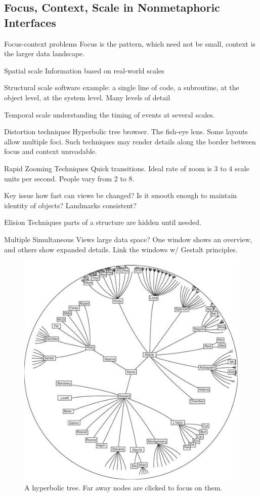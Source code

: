 \begin{mdframed}\begin{multicols}{2}
\subsection{Focus, Context, Scale in Nonmetaphoric Interfaces}
\begin{compactdesc}
\item[Focus-context problems]
    Focus is the pattern, which need not be small, context is the larger data
    landscape.
    \begin{compactdesc}
    \item[Spatial scale] Information based on real-world scales
    \item[Structural scale] software example: a single line of code, a
        subroutine, at the object level, at the system level. Many levels
        of detail
    \item[Temporal scale] understanding the timing of events at several
        scales.
    \end{compactdesc}
\item[Distortion techniques] Hyperbolic tree browser. The fish-eye lens.
    Some layouts allow multiple foci.
    Such techniques may render details along the border between focus and
    context unreadable.
\item[Rapid Zooming Techniques] Quick transitions. Ideal rate of zoom is 3 to 4
    scale units per second. People vary from 2 to 8.
\item[Key issue] how fast can views be changed? Is it smooth enough to maintain
    identity of objects? Landmarks consistent?
\item[Elision Techniques] parts of a structure are hidden until needed.
\item[Multiple Simultaneous Views] large data space? One window shows an
    overview, and others show expanded details. Link the windows w/ Gestalt
    principles.
\end{compactdesc}
\begin{figure}[H] \centering
    \includegraphics[width=0.6\linewidth]{hyperbolic_tree.png}
    \caption{A hyperbolic tree. Far away nodes are clicked to focus on them.}
\end{figure}
\end{multicols}\end{mdframed}



